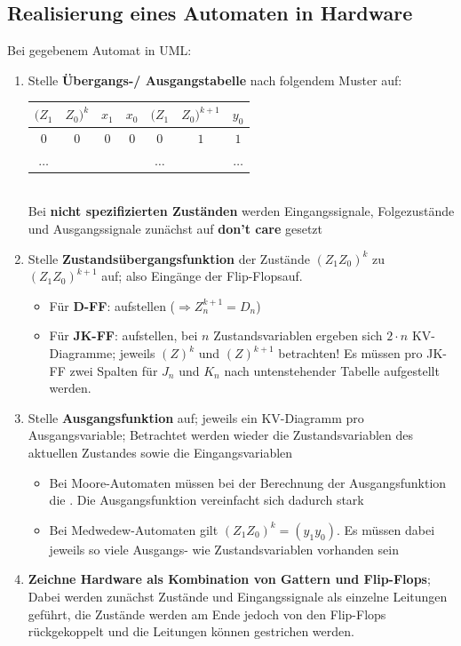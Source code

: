 \documentclass[a5paper,12pt,twoside]{scrartcl}
\begin{document}
\clearpage

\subsection{Realisierung eines Automaten in Hardware}

Bei gegebenem Automat in UML:\@
\begin{enumerate}
\item Stelle \textbf{Übergangs-/ Ausgangstabelle} nach folgendem Muster auf:\\[1em]
  \begin{tabular}{|cccc|cc|c|}
    \hline
    \((Z_1\) & \(Z_0)^k\) & \(x_1\) & \(x_0\) & \((Z_1\) & \(Z_0)^{k+1}\) & \(y_0\)\\
    \hline
    \hline
    \(0\) & \(0\) & \(0\) & \(0\) & \(0\) & \(1\) & \(1\)\\
    \hline
    \(\ldots\) &&&& \(\ldots\)&& \(\ldots\)
  \end{tabular}\\[1em]
  Bei \textbf{nicht spezifizierten Zuständen} werden Eingangssignale, Folgezustände und Ausgangssignale zunächst auf \textbf{don't care} gesetzt
\item Stelle \textbf{Zustandsübergangsfunktion} der Zustände \((Z_1 Z_0)^k\) zu \((Z_1 Z_0)^{k+1}\) auf; also Eingänge der Flip-Flopsauf. 
  \begin{itemize}

  \item Für \textbf{D-FF}:  aufstellen (\(\Rightarrow Z_n^{k+1} = D_n\))
  \item Für \textbf{JK-FF}:  aufstellen, bei \(n\) Zustandsvariablen ergeben sich \(2 \cdot n\) KV-Diagramme; jeweils \((Z)^k\) und \((Z)^{k+1}\) betrachten! Es müssen pro JK-FF zwei Spalten für \(J_n\) und \(K_n\) nach untenstehender Tabelle aufgestellt werden.
  \end{itemize}
\item Stelle \textbf{Ausgangsfunktion} auf; jeweils ein KV-Diagramm pro Ausgangsvariable; Betrachtet werden wieder die Zustandsvariablen des aktuellen Zustandes sowie die Eingangsvariablen
  \begin{itemize}
  \item {} Bei Moore-Automaten müssen bei der Berechnung der Ausgangsfunktion die . Die Ausgangsfunktion vereinfacht sich dadurch stark
  \item {} Bei Medwedew-Automaten gilt \((Z_1 Z_0)^k = (y_1 y_0)\). Es müssen dabei jeweils so viele Ausgangs- wie Zustandsvariablen vorhanden sein
  \end{itemize}
\item \textbf{Zeichne Hardware als Kombination von Gattern und Flip-Flops}; Dabei werden zunächst Zustände und Eingangssignale als einzelne Leitungen geführt, die Zustände werden am Ende jedoch von den Flip-Flops rückgekoppelt und die Leitungen können gestrichen werden.
\end{enumerate}
\end{document}
